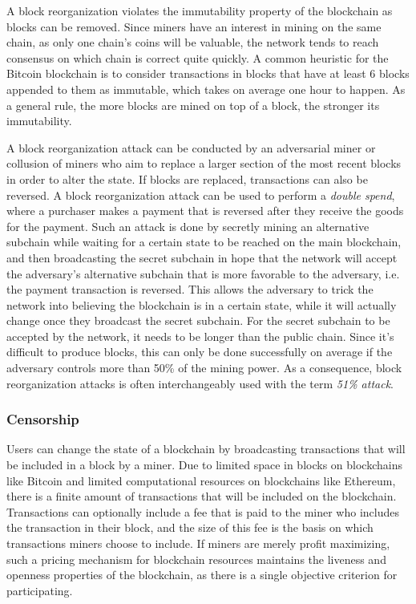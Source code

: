 A block reorganization violates the immutability property of the blockchain as blocks can be removed. Since miners have an interest in mining on the same chain, as only one chain's coins will be valuable, the network tends to reach consensus on which chain is correct quite quickly. A common heuristic for the Bitcoin blockchain is to consider transactions in blocks that have at least 6 blocks appended to them as immutable, which takes on average one hour to happen. As a general rule, the more blocks are mined on top of a block, the stronger its immutability. 

A block reorganization attack can be conducted by an adversarial miner or collusion of miners who aim to replace a larger section of the most recent blocks in order to alter the state. If blocks are replaced, transactions can also be reversed. A block reorganization attack can be used to perform a \emph{double spend}, where a purchaser makes a payment that is reversed after they receive the goods for the payment. Such an attack is done by secretly mining an alternative subchain while waiting for a certain state to be reached on the main blockchain, and then broadcasting the secret subchain in hope that the network will accept the adversary's alternative subchain that is more favorable to the adversary, i.e. the payment transaction is reversed. This allows the adversary to trick the network into believing the blockchain is in a certain state, while it will actually change once they broadcast the secret subchain. For the secret subchain to be accepted by the network, it needs to be longer than the public chain. Since it's difficult to produce blocks, this can only be done successfully on average if the adversary controls more than 50\% of the mining power. As a consequence, block reorganization attacks is often interchangeably used with the term \emph{51\% attack}.

\subsubsection{Censorship}
Users can change the state of a blockchain by broadcasting transactions that will be included in a block by a miner. Due to limited space in blocks on blockchains like Bitcoin and limited computational resources on blockchains like Ethereum, there is a finite amount of transactions that will be included on the blockchain. Transactions can optionally include a fee that is paid to the miner who includes the transaction in their block, and the size of this fee is the basis on which transactions miners choose to include. If miners are merely profit maximizing, such a pricing mechanism for blockchain resources maintains the liveness and openness properties of the blockchain, as there is a single objective criterion for participating.


